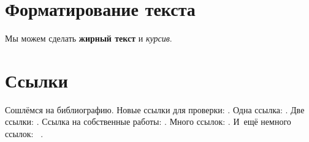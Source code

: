 
\section{Форматирование текста}\label{sec:ch1/sec1}

Мы можем сделать \textbf{жирный текст} и \textit{курсив}.

\section{Ссылки}\label{sec:ch1/sec2}

Сошлёмся на библиографию.
Новые ссылки для проверки: \cite{InvertedFiles,MohriWfstAsr,WfstDecAnatomy,ConfNetConsensus,ManguConfNetIndex,Pan2007analytical}.
Одна ссылка: \cite[с.~54]{Sokolov}\cite[с.~36]{Gaidaenko}.
Две ссылки: \cite{Sokolov,Gaidaenko}.
Ссылка на собственные работы: \cite{scopus_rvect, scopus_voices, scopus_arch}.
Много ссылок: %
\cite{Lermontov, Management, Borozda, Marketing, Constitution, FamilyCode,
    Gost.7.0.53, Razumovski, Lagkueva, Pokrovski, Methodology, Berestova,
    Kriger}%
%
.
И~ещё немного ссылок:~\cite{Article,Book,Booklet,Conference,Inbook,Incollection,Manual,Mastersthesis,
    Misc,Phdthesis,Proceedings,Techreport,Unpublished}
\cite{medvedev2006jelektronnye, CEAT:CEAT581, doi:10.1080/01932691.2010.513279,
    Gosele1999161,Li2007StressAnalysis, Shoji199895, test:eisner-sample,
    test:eisner-sample-shorted, AB_patent_Pomerantz_1968, iofis_patent1960}%
%
.

%

